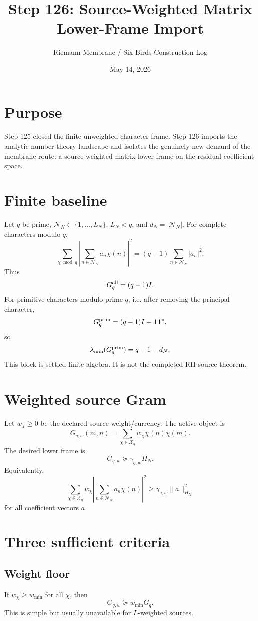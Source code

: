 \documentclass[11pt]{article}
\title{Step 126: Source-Weighted Matrix Lower-Frame Import}
\author{Riemann Membrane / Six Birds Construction Log}
\date{May 14, 2026}
\begin{document}
\maketitle

\section{Purpose}
Step 125 closed the finite unweighted character frame.  Step 126 imports the analytic-number-theory landscape and isolates the genuinely new demand of the membrane route: a source-weighted matrix lower frame on the residual coefficient space.

\section{Finite baseline}
Let $q$ be prime, $\mathcal N_N\subset\{1,\ldots,L_N\}$, $L_N<q$, and $d_N=|\mathcal N_N|$.  For complete characters modulo $q$,
\[
\sum_{\chi\bmod q}\left|\sum_{n\in\mathcal N_N}a_n\chi(n)\right|^2=(q-1)\sum_{n\in\mathcal N_N}|a_n|^2.
\]
Thus
\[
G_q^{\rm all}=(q-1)I.
\]
For primitive characters modulo prime $q$, i.e. after removing the principal character,
\[
G_q^{\rm prim}=(q-1)I-\mathbf 1\mathbf 1^*,
\]
so
\[
\lambda_{\min}(G_q^{\rm prim})=q-1-d_N.
\]
This block is settled finite algebra.  It is not the completed RH source theorem.

\section{Weighted source Gram}
Let $w_\chi\ge0$ be the declared source weight/currency.  The active object is
\[
G_{q,w}(m,n)=\sum_{\chi\in\mathcal X_q}w_\chi\chi(n)\overline{\chi(m)}.
\]
The desired lower frame is
\[
G_{q,w}\succeq\gamma_{q,w}H_N.
\]
Equivalently,
\[
\sum_{\chi\in\mathcal X_q}w_\chi\left|\sum_{n\in\mathcal N_N}a_n\chi(n)\right|^2\ge\gamma_{q,w}\|a\|_{H_N}^2
\]
for all coefficient vectors $a$.

\section{Three sufficient criteria}
\subsection{Weight floor}
If $w_\chi\ge w_{\min}$ for all $\chi$, then
\[
G_{q,w}\succeq w_{\min}G_q.
\]
This is simple but usually unavailable for $L$-weighted sources.
\end{document}
